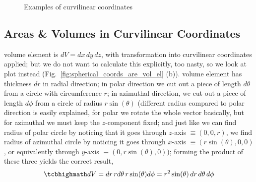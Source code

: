 \documentclass[../class_mech_main.tex]{subfiles}
\begin{document}
\begin{figure}
    \centering

    \hspace*{0.08\textwidth}%

    \caption{Examples of curvilinear coordinates}
    \label{fig:spherical_cylindrical_coords}
\end{figure}



        \subsection{Areas \& Volumes in Curvilinear Coordinates}

volume element is $dV = dx \, dy \, dz$, with transformation into curvilinear coordinates applied; but we do not want to calculate this explicitly, too nasty, so we look at plot instead (Fig.~\ref{fig:spherical_coords_are_vol_el} (b)). volume element has thickness $dr$ in radial direction; in polar direction we cut out a piece of length $d\theta$ from a circle with circumference $r$; in azimuthal direction, we cut out a piece of length $d\phi$ from a circle of radius $r \sin(\theta)$ (different radius compared to polar direction is easily explained, for polar we rotate the whole vector basically, but for azimuthal we must keep the $z$-component fixed; and just like we can find radius of polar circle by noticing that it goes through $z$-axis $\equiv (0, 0, r)$, we find radius of azimuthal circle by noticing it goes through $x$-axis $\equiv (r \sin(\theta), 0, 0)$, or equivalently through $y$-axis $\equiv (0, r \sin(\theta), 0)$); forming the product of these three yields the correct result,
\begin{equation}
    \eqbox{
        dV = dr \, r d\theta \, r \sin(\theta) d\phi = r^2 \sin(\theta) \, dr \, d\theta \, d\phi
    }
\end{equation}
\end{document}
